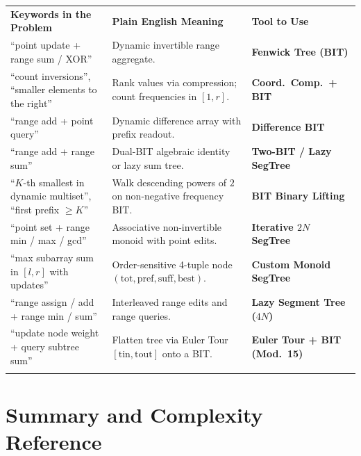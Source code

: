 \documentclass[11pt,a4paper]{article}
\theoremstyle{definition}
\begin{document}
\begingroup\small{}
\begin{tabularx}{\textwidth}{>{\raggedright\arraybackslash}p{4.3cm} >{\raggedright\arraybackslash}X >{\raggedright\arraybackslash\bfseries}p{4.0cm}}
\arrayrulecolor{primaryblue}\toprule[1.2pt]
\rowcolor{primaryblue!10}
\textcolor{primaryblue}{\textbf{Keywords in the Problem}} & \textcolor{primaryblue}{\textbf{Plain English Meaning}} & \textcolor{primaryblue}{\textbf{Tool to Use}} \\
\arrayrulecolor{codeframe}\midrule[0.6pt]
``point update + range sum / XOR'' & Dynamic invertible range aggregate. & Fenwick Tree (BIT) \\
``count inversions'', ``smaller elements to the right'' & Rank values via compression; count frequencies in $[1, r]$. & Coord.\ Comp.\ + BIT \\
``range add + point query'' & Dynamic difference array with prefix readout. & Difference BIT \\
``range add + range sum'' & Dual-BIT algebraic identity or lazy sum tree. & Two-BIT / Lazy SegTree \\
``$K$-th smallest in dynamic multiset'', ``first prefix $\ge K$'' & Walk descending powers of $2$ on non-negative frequency BIT. & BIT Binary Lifting \\
``point set + range min / max / gcd'' & Associative non-invertible monoid with point edits. & Iterative $2N$ SegTree \\
``max subarray sum in $[l, r]$ with updates'' & Order-sensitive 4-tuple node $(\text{tot}, \text{pref}, \text{suff}, \text{best})$. & Custom Monoid SegTree \\
``range assign / add + range min / sum'' & Interleaved range edits and range queries. & Lazy Segment Tree ($4N$) \\
``update node weight + query subtree sum'' & Flatten tree via Euler Tour $[\text{tin}, \text{tout}]$ onto a BIT. & Euler Tour + BIT (Mod.\ 15) \\
\arrayrulecolor{primaryblue}\bottomrule[1.2pt]
\end{tabularx}\endgroup

\section{Summary and Complexity Reference}
\end{document}
